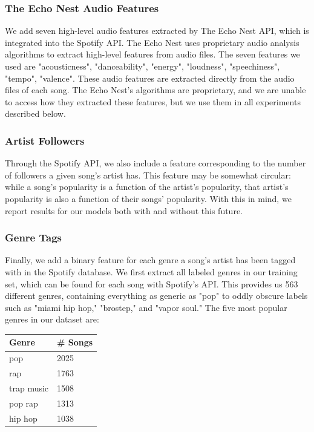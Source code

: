 \documentclass[journal]{IEEEtran}
\begin{document}
\subsubsection{The Echo Nest Audio Features}
We add seven high-level audio features extracted by The Echo Nest API, which is integrated into the Spotify API. The Echo Nest uses proprietary audio analysis algorithms to extract high-level features from audio files. The seven features we used are "acousticness", "danceability", "energy", "loudness", "speechiness", "tempo", "valence". These audio features are extracted directly from the audio files of each song. The Echo Nest's algorithms are proprietary, and we are unable to access how they extracted these features, but we use them in all experiments described below. \\

\subsubsection{Artist Followers}
Through the Spotify API, we also include a feature corresponding to the number of followers a given song's artist has. This feature may be somewhat circular: while a song's popularity is a function of the artist's popularity, that artist's popularity is also a function of their songs' popularity. With this in mind, we report results for our models both with and without this future.

\subsubsection{Genre Tags}
Finally, we add a binary feature for each genre a song's artist has been tagged with in the Spotify database. We first extract all labeled genres in our training set, which can be found for each song with Spotify's API. This provides us 563 different genres, containing everything as generic as "pop" to oddly obscure labels such as "miami hip hop," "brostep," and "vapor soul." The five most popular genres in our dataset are:

\begin{center}
\begin{tabular}{|l|l|}
\hline
\textbf{Genre} & \textbf{# Songs} \\ \hline
pop                & 2025                 \\ \hline
rap                & 1763                 \\ \hline
trap music         & 1508                 \\ \hline
pop rap            & 1313                 \\ \hline
hip hop            & 1038                 \\ \hline
\end{tabular} \\
\end{center}
\end{document}
